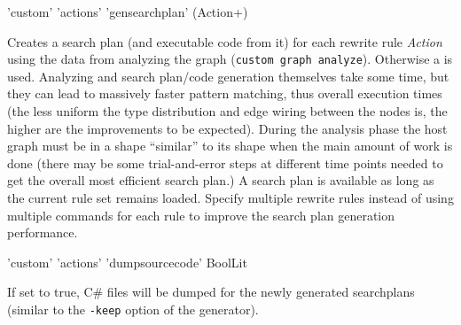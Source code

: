 \begin{rail}
  'custom' 'actions' 'gensearchplan' (Action+)
\end{rail}
Creates a search plan (and executable code from it) for each rewrite rule \emph{Action} using the data from analyzing the graph (\texttt{custom graph analyze}).
Otherwise a  is used. 
Analyzing and search plan/code generation themselves take some time, but they can lead to massively faster pattern matching, thus overall execution times
(the less uniform the type distribution and edge wiring between the nodes is, the higher are the improvements to be expected).
During the analysis phase the host graph must be in a shape ``similar'' to its shape when the main amount of work is done
(there may be some trial-and-error steps at different time points needed to get the overall most efficient search plan.)
A search plan is available as long as the current rule set remains loaded. 
Specify multiple rewrite rules instead of using multiple commands for each rule to improve the search plan generation performance.

\begin{rail}
  'custom' 'actions' 'dumpsourcecode' BoolLit
\end{rail}
If set to true, C\# files will be dumped for the newly generated searchplans (similar to the \texttt{-keep} option of the generator).

